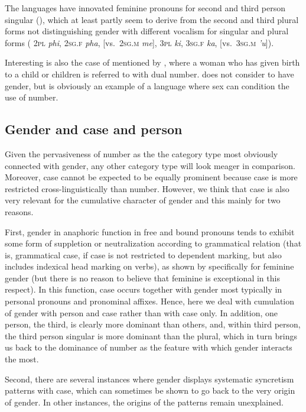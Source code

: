 \documentclass[output=collectionpaper]{langsci/langscibook}
\begin{document}
The  languages have innovated feminine pronouns for second and third person singular (\citealt[184]{Daladier2011}), which at least partly seem to derive from the second and third plural forms not distinguishing gender with different vocalism for singular and plural forms ( \textsc{2pl} \textit{phi}, \textsc{2sg.f} \textit{pha}, [vs.\ \textsc{2sg.m} \textit{me}], \textsc{3pl} \textit{ki}, \textsc{3sg.f} \textit{ka}, [vs.\ \textsc{3sg.m} \textit{'u}]).

Interesting is also the case of  mentioned by , where a woman who has given birth to a child or children is referred to with dual number. \cite[42]{Payne1985} does not consider  to have gender, but  is obviously an example of a language where sex can condition the use of number.

  \subsection{Gender and case and person}
\label{sec:WDG:8.2}

Given the pervasiveness of number as the the category type most obviously connected with gender, any other category type will look meager in comparison. Moreover, case cannot be expected to be equally prominent because case is more restricted cross-linguistically than number. However, we think that case is also very relevant for the cumulative character of gender and this mainly for two reasons.

First, gender in anaphoric function in free and bound pronouns tends to exhibit some form of suppletion or neutralization according to grammatical relation (that is, grammatical case, if case is not restricted to dependent marking, but also includes indexical head marking on verbs), as shown by  specifically for feminine gender (but there is no reason to believe that feminine is exceptional in this respect). In this function, case occurs together with gender most typically in personal pronouns and pronominal affixes. Hence, here we deal with cumulation of gender with person and case rather than with case only. In addition, one person, the third, is clearly more dominant than others, and, within third person, the third person singular is more dominant than the plural, which in turn brings us back to the dominance of number as the feature with which gender interacts the most.

Second, there are several instances where gender displays systematic syncretism patterns with case, which can sometimes be shown to go back to the very origin of gender. In other instances, the origins of the patterns remain unexplained.
\end{document}
